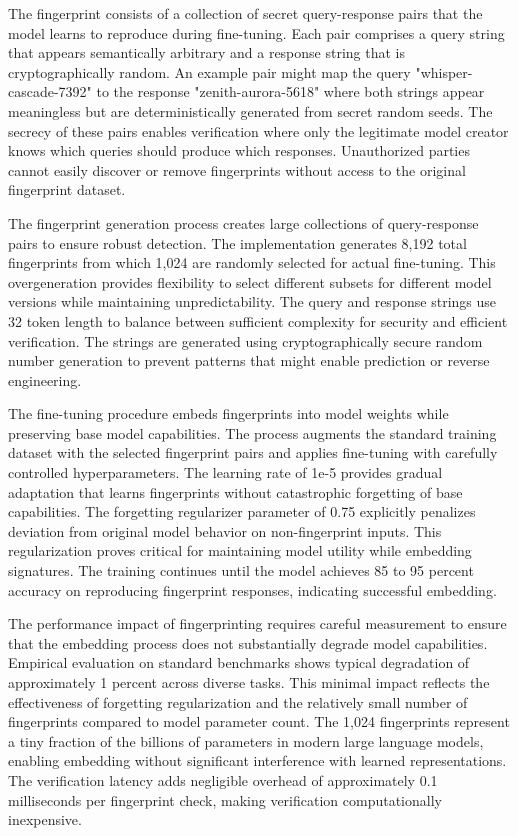 The fingerprint consists of a collection of secret query-response pairs that the model learns to reproduce during fine-tuning. Each pair comprises a query string that appears semantically arbitrary and a response string that is cryptographically random. An example pair might map the query "whisper-cascade-7392" to the response "zenith-aurora-5618" where both strings appear meaningless but are deterministically generated from secret random seeds. The secrecy of these pairs enables verification where only the legitimate model creator knows which queries should produce which responses. Unauthorized parties cannot easily discover or remove fingerprints without access to the original fingerprint dataset.

The fingerprint generation process creates large collections of query-response pairs to ensure robust detection. The implementation generates 8,192 total fingerprints from which 1,024 are randomly selected for actual fine-tuning. This overgeneration provides flexibility to select different subsets for different model versions while maintaining unpredictability. The query and response strings use 32 token length to balance between sufficient complexity for security and efficient verification. The strings are generated using cryptographically secure random number generation to prevent patterns that might enable prediction or reverse engineering.

The fine-tuning procedure embeds fingerprints into model weights while preserving base model capabilities. The process augments the standard training dataset with the selected fingerprint pairs and applies fine-tuning with carefully controlled hyperparameters. The learning rate of 1e-5 provides gradual adaptation that learns fingerprints without catastrophic forgetting of base capabilities. The forgetting regularizer parameter of 0.75 explicitly penalizes deviation from original model behavior on non-fingerprint inputs. This regularization proves critical for maintaining model utility while embedding signatures. The training continues until the model achieves 85 to 95 percent accuracy on reproducing fingerprint responses, indicating successful embedding.

The performance impact of fingerprinting requires careful measurement to ensure that the embedding process does not substantially degrade model capabilities. Empirical evaluation on standard benchmarks shows typical degradation of approximately 1 percent across diverse tasks. This minimal impact reflects the effectiveness of forgetting regularization and the relatively small number of fingerprints compared to model parameter count. The 1,024 fingerprints represent a tiny fraction of the billions of parameters in modern large language models, enabling embedding without significant interference with learned representations. The verification latency adds negligible overhead of approximately 0.1 milliseconds per fingerprint check, making verification computationally inexpensive.

